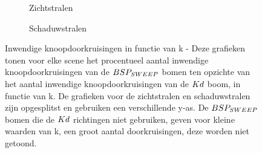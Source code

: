 \begin{figure}
  \centering
  \begin{subfigure}{\linewidth}
  \centering
  \begin{subfigure}[t]{.32\linewidth}
    \centering
{}
  \end{subfigure}
  \begin{subfigure}[t]{.32\linewidth}
    \centering
{}
\end{subfigure}
\begin{subfigure}[t]{.32\linewidth}
  \centering
{}
\end{subfigure}
\caption{Zichtstralen}
\end{subfigure}
  \begin{subfigure}{\linewidth}
  \centering
  \begin{subfigure}[t]{.32\linewidth}
    \centering
{}
  \end{subfigure}
  \begin{subfigure}[t]{.32\linewidth}
    \centering
{}
\end{subfigure}
\begin{subfigure}[t]{.32\linewidth}
  \centering
{}
\end{subfigure}
\caption{Schaduwstralen}
\end{subfigure}
\caption[Inwendige knoopdoorkruisingen in functie van k]{Inwendige knoopdoorkruisingen in functie van k - \small Deze grafieken tonen voor elke scene het procentueel aantal inwendige knoopdoorkruisingen van de $BSP_{SWEEP}$ bomen ten opzichte van het aantal inwendige knoopdoorkruisingen van de $Kd$ boom, in functie van k. De grafieken voor de zichtstralen en schaduwstralen zijn opgesplitst en gebruiken een verschillende y-as. De $BSP_{SWEEP}$ bomen die de $Kd$ richtingen niet gebruiken, geven voor kleine waarden van k, een groot aantal doorkruisingen, deze worden niet getoond.}
\label{fig:k-doorkruisingen}
\end{figure}


